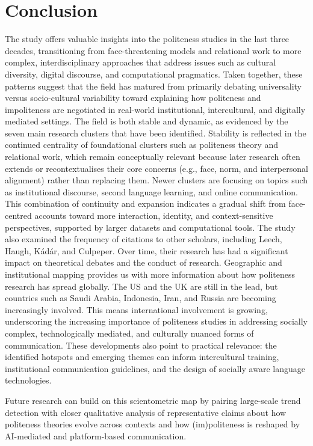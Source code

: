 \documentclass[english]{textolivre}
\begin{document}
\section{Conclusion}
The study offers valuable insights into the politeness studies in the last three decades, transitioning from face-threatening models and relational work to more complex, interdisciplinary approaches that address issues such as cultural diversity, digital discourse, and computational pragmatics. Taken together, these patterns suggest that the field has matured from primarily debating universality versus socio-cultural variability toward explaining how politeness and impoliteness are negotiated in real-world institutional, intercultural, and digitally mediated settings. The field is both stable and dynamic, as evidenced by the seven main research clusters that have been identified. Stability is reflected in the continued centrality of foundational clusters such as politeness theory and relational work, which remain conceptually relevant because later research often extends or recontextualises their core concerns (e.g., face, norm, and interpersonal alignment) rather than replacing them. Newer clusters are focusing on topics such as institutional discourse, second language learning, and online communication. This combination of continuity and expansion indicates a gradual shift from face-centred accounts toward more interaction, identity, and context-sensitive perspectives, supported by larger datasets and computational tools. The study also examined the frequency of citations to other scholars, including Leech, Haugh, Kádár, and Culpeper. Over time, their research has had a significant impact on theoretical debates and the conduct of research. Geographic and institutional mapping provides us with more information about how politeness research has spread globally. The US and the UK are still in the lead, but countries such as Saudi Arabia, Indonesia, Iran, and Russia are becoming increasingly involved. This means international involvement is growing, underscoring the increasing importance of politeness studies in addressing socially complex, technologically mediated, and culturally nuanced forms of communication. These developments also point to practical relevance: the identified hotspots and emerging themes can inform intercultural training, institutional communication guidelines, and the design of socially aware language technologies.

Future research can build on this scientometric map by pairing large-scale trend detection with closer qualitative analysis of representative claims about how politeness theories evolve across contexts and how (im)politeness is reshaped by AI-mediated and platform-based communication.
\end{document}
